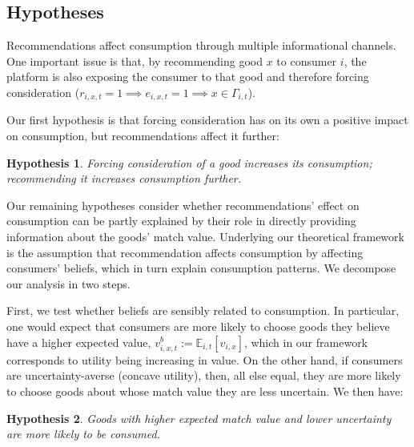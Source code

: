 \documentclass[12pt]{article}
\theoremstyle{newtheorem}
\newtheorem{hypothesis}{Hypothesis}
\begin{document}
\subsection{Hypotheses}
\label{section:framework:hypotheses}
Recommendations affect consumption through multiple informational channels. 
One important issue is that, by recommending good $x$ to consumer $i$, the platform is also exposing the consumer to that good and therefore forcing consideration ($r_{i,x,t}=1\implies e_{i,x,t}=1 \implies x\in\Gamma_{i,t}$). 

Our first hypothesis is that forcing consideration has on its own a positive impact on consumption, but recommendations affect it further:
\begin{hypothesis}
 \label{hypothesis:consumption-on-rec}
 Forcing consideration of a good increases its consumption; recommending it increases consumption further.
\end{hypothesis}


Our remaining hypotheses consider whether recommendations' effect on consumption can be partly explained by their role in directly providing information about the goods' match value.
Underlying our theoretical framework is the assumption that recommendation affects consumption by affecting consumers' beliefs, which in turn explain consumption patterns.
We decompose our analysis in two steps.


First, we test whether beliefs are sensibly related to consumption. 
In particular, one would expect that consumers are more likely to choose goods they believe have a higher expected value, $v_{i,x,t}^b:=\mathbb E_{i,t}[v_{i,x}]$, which in our framework corresponds to utility being increasing in value.
On the other hand, if consumers are uncertainty-averse (concave utility), then, all else equal, they are more likely to choose goods about whose match value they are less uncertain.
We then have:
\begin{hypothesis}
 \label{hypothesis:consumption-on-beliefs}
 Goods with higher expected match value and lower uncertainty are more likely to be consumed.
\end{hypothesis}
\end{document}
